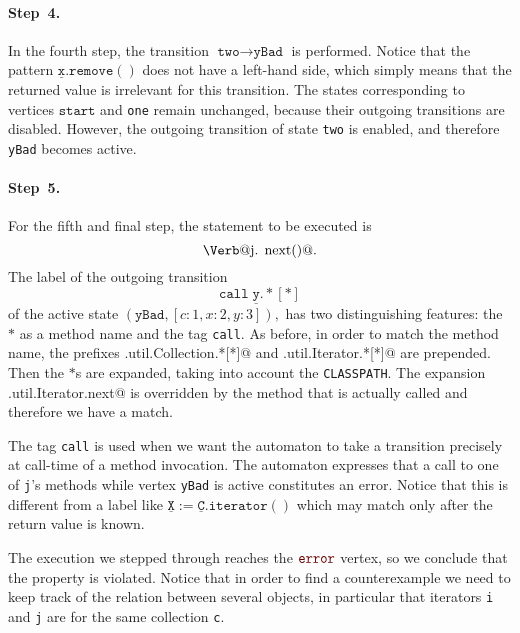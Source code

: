 \documentclass{sigplanconf}[10pt] %
\makeatletter
\newcommand{\error}{\ensuremath{\textcolor{darkred}{\mathtt{error}}}\xspace}
\newcommand{\pattern}[1]{\ensuremath{\mathtt{\underline{#1}}}}
\newcommand{\start}{\ensuremath{\mathtt{start}}\xspace}
\newcommand{\verbline}[2][]{\[\text{\Verb@#2@}#1\]}
\makeatother
\begin{document}
\paragraph{Step~4.}

In the fourth step, the transition $\texttt{two}\to\texttt{yBad}$ is performed.
Notice that the pattern $\pattern{x}.\mathtt{remove}()$ does not have a left-hand side, which simply means that the returned value is irrelevant for this transition.
The states corresponding to vertices \start and {\tt one} remain unchanged, because their outgoing transitions are disabled.
However,  the outgoing transition of state {\tt two} is enabled, and therefore {\tt yBad} becomes active.

\paragraph{Step~5.}

For the fifth and final step, the statement to be executed is \verbline[.]{j.\PY{n+na}{next}()}
The label of the outgoing transition  \[\mathtt{call}\;\pattern{y}.{*}[*]\] of the active state $(\texttt{yBad},[c:1,x:2,y:3]),$
has two distinguishing features: the~$*$ as a method name and the tag \texttt{call}.
As before, in order to match the method name, the prefixes
\Verb@java.util.Collection.*[*]@ and \Verb@java.util.Iterator.*[*]@
are prepended.
Then the $*$s are expanded, taking into account the \texttt{CLASSPATH}.
The expansion \Verb@java.util.Iterator.next@ is overridden by the method that is actually called and therefore 
we have a match.

The tag {\tt call} is used when we want the automaton to take a transition precisely at call-time of a method invocation.
The automaton expresses that a call to one of {\tt j}'s methods while vertex \texttt{yBad} is active constitutes an error.
Notice that this is different from a label like $\pattern X:=\pattern C.\mathtt{iterator}()$ which may match only after the return value is known.

\medskip
The execution we stepped through reaches the \error vertex, so we conclude that the property is violated.
Notice that in order to find a counterexample we need to keep track of the relation between several objects, in particular that iterators {\tt i} and {\tt j} are for the same collection {\tt c}.

\end{document}
